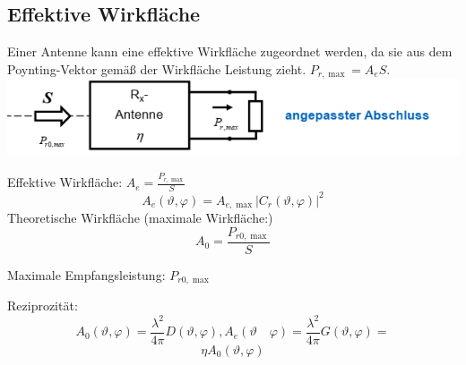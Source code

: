 \documentclass[english]{latex4ei/latex4ei_sheet}
\begin{document}
\begin{sectionbox}
\subsection{Effektive Wirkfläche}
Einer Antenne kann eine effektive Wirkfläche zugeordnet werden, da sie aus dem Poynting-Vektor gemäß der Wirkfläche Leistung zieht. $P_{r,\max} = A_e S$.\\
\includegraphics[width=\textwidth]{./img/antenne_eff_flaeche.png}
\begin{emphbox}
Effektive Wirkfläche: $A_e = \frac{P_{r,\max}}{S}$
$$
A_{e}(\vartheta, \varphi)=A_{e, \max }\left|C_{r}(\vartheta, \varphi)\right|^{2}
$$
Theoretische Wirkfläche (maximale Wirkfläche:)
$$A_0 = \frac{P_{r0, \max}}{S}$$

Maximale Empfangsleistung: $P_{r0, \max}$


Reziprozität:
$$
A_{0}(\vartheta, \varphi)=\frac{\lambda^{2}}{4 \pi} D(\vartheta, \varphi), A_{e}(\vartheta \quad \varphi)=\frac{\lambda^{2}}{4 \pi} G(\vartheta, \varphi)=$$
$$
\eta A_{0}(\vartheta, \varphi)
$$
\end{emphbox}
\end{sectionbox}
\end{document}
